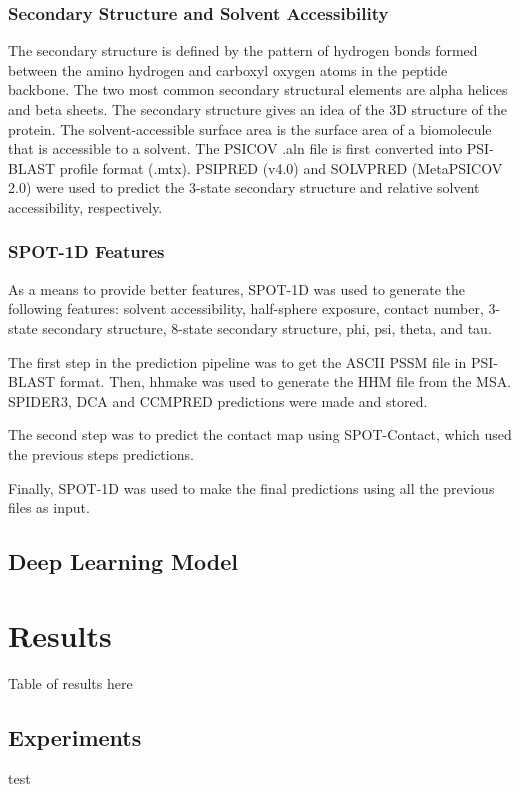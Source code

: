 \documentclass[journal=jacsat,manuscript=article]{achemso}
\begin{document}
\subsubsection{Secondary Structure and Solvent Accessibility}
The secondary structure is defined by the pattern of hydrogen bonds formed between the amino hydrogen and carboxyl oxygen atoms in the peptide backbone. The two most common secondary structural elements are alpha helices and beta sheets. The secondary structure gives an idea of the 3D structure of the protein.
The solvent-accessible surface area is the surface area of a biomolecule that is accessible to a solvent.
The PSICOV .aln file is first converted into PSI-BLAST \cite{altschul1997gapped} profile format (.mtx). PSIPRED (v4.0) and SOLVPRED (MetaPSICOV 2.0) were used to predict the 3-state secondary structure and relative solvent accessibility, respectively.

\subsubsection{SPOT-1D Features}
As a means to provide better features, SPOT-1D \cite{hanson2019improving} was used to generate the following features: solvent accessibility, half-sphere exposure, contact number, 3-state secondary structure, 8-state secondary structure, phi, psi, theta, and tau.

The first step in the prediction pipeline was to get the ASCII PSSM file in PSI-BLAST format. Then, hhmake was used to generate the HHM file from the MSA. SPIDER3, DCA and CCMPRED predictions were made and stored.

The second step was to predict the contact map using SPOT-Contact, which used the previous steps predictions.

Finally, SPOT-1D was used to make the final predictions using all the previous files as input.

\subsection{Deep Learning Model}

\section{Results}
Table of results here

\subsection{Experiments}
test
\end{document}
